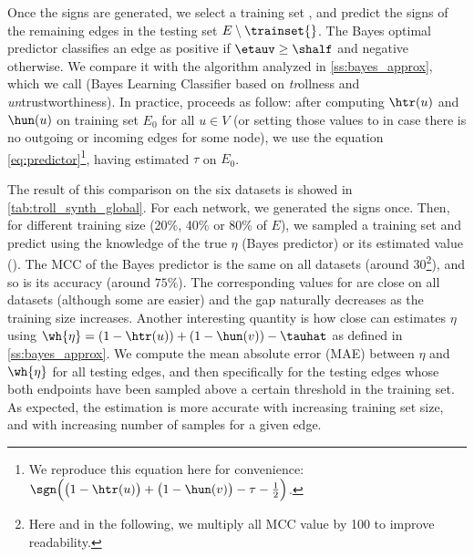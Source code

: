 \begin{newcontent}
Once the signs are generated, we select a training set \trainset{} \uar{}, and predict
the signs of the remaining edges in the testing set $E\setminus \trainset{}$. The Bayes optimal
predictor classifies an edge \euv{} as positive if $\etauv \geq \shalf$ and negative otherwise. 
We compare it with the algorithm analyzed in \autoref{ss:bayes_approx}, which we call \usrule{}
(Bayes Learning Classifier based on \emph{tr}ollness and \emph{un}trustworthiness). In practice,
\usrule{} proceeds as follow: after computing $\htr(u)$ and $\hun(u)$ on training set $E_0$ for all
$u \in V$ (or setting those values to \shalf{} in case there is no outgoing or incoming edges for
some node), we use the equation \eqref{eq:predictor}\footnote{We reproduce this equation here for
convenience: $\sgn\Big(\big(1-\htr(u)\big) + \big(1-\hun(v)\big) -\tau - \tfrac{1}{2}\Big)$.},
having estimated $\tau$ on $E_0$.

The result of this comparison on the six datasets is showed in \autoref{tab:troll_synth_global}.
For each network, we generated the signs once. Then, for different training size (20\%, 40\% or 80\%
of $E$), we sampled a training set and predict using the knowledge of the true $\eta$ (Bayes
predictor) or its estimated value (\usrule{}).
The MCC of the Bayes predictor is the same on all datasets (around $30$\footnote{Here and in the
following, we multiply all MCC value by 100 to improve readability.}), and so is its accuracy
(around $75\%$). The corresponding values for \usrule{} are close on all datasets (although some are
easier) and the gap naturally decreases as the training size increases. Another interesting
quantity is how close can \usrule{} estimates $\eta$ using $\wh{\eta} = \left(1-\htr(u)\right) +
\left(1-\hun(v)\right) -\tauhat$ as defined in \autoref{ss:bayes_approx}. We compute the mean
absolute error (MAE) between $\eta$ and $\wh{\eta}$ for all testing edges, and then specifically for
the testing edges whose both endpoints have been sampled above a certain threshold in the training
set. As expected, the estimation is more accurate with increasing training set size, and with
increasing number of samples for a given edge.




\end{newcontent}
